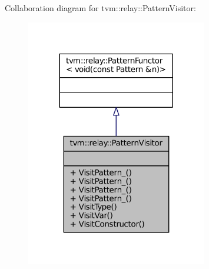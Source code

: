 Collaboration diagram for tvm\+:\+:relay\+:\+:Pattern\+Visitor\+:
\nopagebreak
\begin{figure}[H]
\begin{center}
\leavevmode
\includegraphics[width=224pt]{classtvm_1_1relay_1_1PatternVisitor__coll__graph}
\end{center}
\end{figure}

